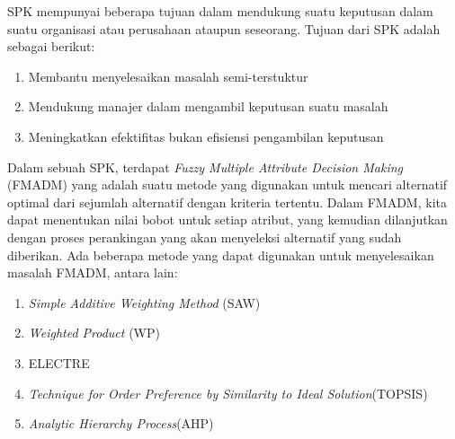 	SPK mempunyai beberapa tujuan dalam mendukung suatu keputusan dalam suatu organisasi atau perusahaan ataupun seseorang. Tujuan dari SPK adalah sebagai berikut:
	
	\begin{enumerate}
		\item Membantu menyelesaikan masalah semi-terstuktur
		\item Mendukung manajer dalam mengambil keputusan suatu masalah
		\item Meningkatkan efektifitas bukan efisiensi pengambilan keputusan
	\end{enumerate}

	Dalam sebuah SPK, terdapat \textit{Fuzzy Multiple Attribute Decision Making} (FMADM) yang adalah suatu metode yang digunakan untuk mencari alternatif optimal dari sejumlah alternatif dengan kriteria tertentu. Dalam FMADM, kita dapat menentukan nilai bobot untuk setiap atribut, yang kemudian dilanjutkan dengan proses perankingan yang akan menyeleksi alternatif yang sudah diberikan. Ada beberapa metode yang dapat digunakan untuk menyelesaikan masalah FMADM, antara lain:
	
	\begin{enumerate}
		\item \textit{Simple Additive Weighting Method} (SAW)
		\item \textit{Weighted Product} (WP)
		\item ELECTRE
		\item \textit{Technique for Order Preference by Similarity to Ideal Solution}(TOPSIS)
		\item \textit{Analytic Hierarchy Process}(AHP)
	\end{enumerate}
	
	

